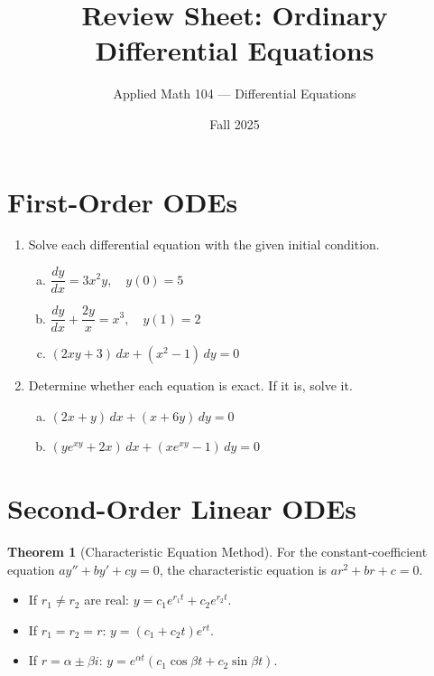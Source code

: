 \documentclass[11pt]{article}
\title{Review Sheet: Ordinary Differential Equations}
\author{Applied Math 104 --- Differential Equations}
\date{Fall 2025}
\theoremstyle{definition}
\newtheorem*{theorem*}{Theorem}
\begin{document}
\maketitle

\section*{First-Order ODEs}

\begin{enumerate}
\item Solve each differential equation with the given initial condition.
\begin{enumerate}[(a)]
  \item $\dfrac{dy}{dx} = 3x^2 y, \quad y(0) = 5$

  \item $\dfrac{dy}{dx} + \dfrac{2y}{x} = x^3, \quad y(1) = 2$

  \item $(2xy + 3) \, dx + (x^2 - 1) \, dy = 0$
\end{enumerate}

\item Determine whether each equation is exact. If it is, solve it.
\begin{enumerate}[(a)]
  \item $(2x + y) \, dx + (x + 6y) \, dy = 0$
  \item $(ye^{xy} + 2x) \, dx + (xe^{xy} - 1) \, dy = 0$
\end{enumerate}
\end{enumerate}

\section*{Second-Order Linear ODEs}

\begin{theorem*}[Characteristic Equation Method]
For the constant-coefficient equation $ay'' + by' + cy = 0$, the characteristic equation is $ar^2 + br + c = 0$.
\begin{itemize}
  \item If $r_1 \neq r_2$ are real: $y = c_1 e^{r_1 t} + c_2 e^{r_2 t}$.
  \item If $r_1 = r_2 = r$: $y = (c_1 + c_2 t) e^{rt}$.
  \item If $r = \alpha \pm \beta i$: $y = e^{\alpha t}(c_1 \cos \beta t + c_2 \sin \beta t)$.
\end{itemize}
\end{theorem*}
\end{document}
